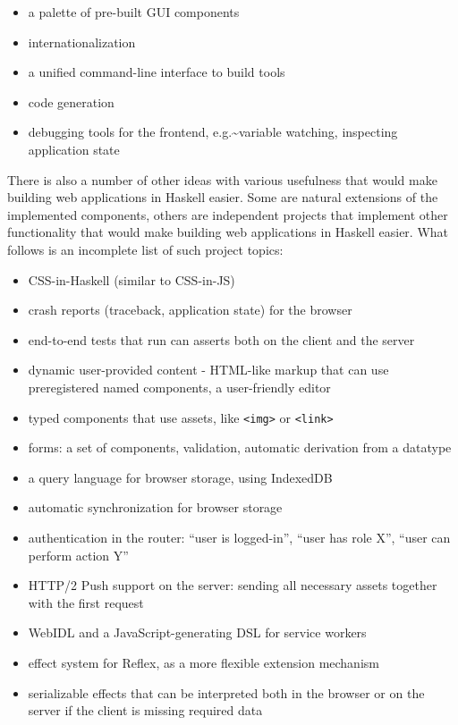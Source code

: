 \documentclass[english,odsaz]{fitthesis}
\begin{document}
\begin{itemize}
\item a palette of pre-built GUI components
\item internationalization
\item a unified command-line interface to build tools
\item code generation
\item debugging tools for the frontend, e.g.\textasciitilde{}variable watching, inspecting application state
\end{itemize}

There is also a number of other ideas with various usefulness that would make
building web applications in Haskell easier. Some are natural extensions of the
implemented components, others are independent projects that implement other
functionality that would make building web applications in Haskell easier. What
follows is an incomplete list of such project topics:

\begin{itemize}
\item CSS-in-Haskell (similar to CSS-in-JS)
\item crash reports (traceback, application state) for the browser
\item end-to-end tests that run can asserts both on the client and the server
\item dynamic user-provided content - HTML-like markup that can use preregistered named
components, a user-friendly editor
\item typed components that use assets, like \texttt{<img>} or \texttt{<link>}
\item forms: a set of components, validation, automatic derivation from a datatype
\item a query language for browser storage, using IndexedDB
\item automatic synchronization for browser storage
\item authentication in the router: ``user is logged-in'', ``user has role X'', ``user
can perform action Y''
\item HTTP/2 Push support on the server: sending all necessary assets together with
the first request
\item WebIDL and a JavaScript-generating DSL for service workers
\item effect system for Reflex, as a more flexible extension mechanism
\item serializable effects that can be interpreted both in the browser or on the
server if the client is missing required data
\end{itemize}
\end{document}

